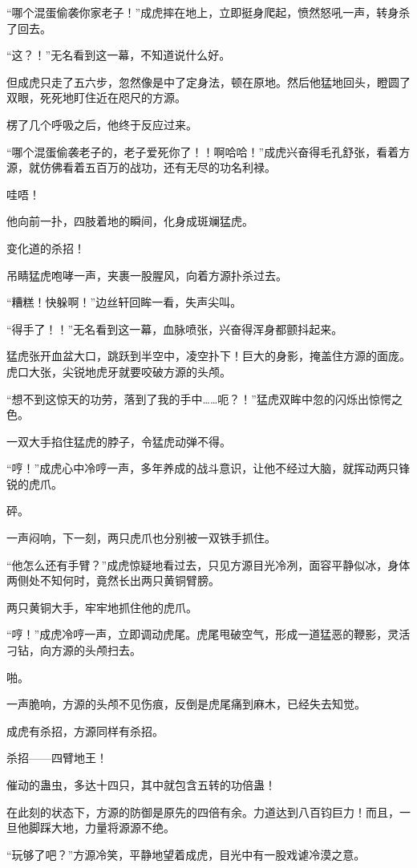 \begin{this_body}
“哪个混蛋偷袭你家老子！”成虎摔在地上，立即挺身爬起，愤然怒吼一声，转身杀了回去。

“这？！”无名看到这一幕，不知道说什么好。

但成虎只走了五六步，忽然像是中了定身法，顿在原地。然后他猛地回头，瞪圆了双眼，死死地盯住近在咫尺的方源。

楞了几个呼吸之后，他终于反应过来。

“哪个混蛋偷袭老子的，老子爱死你了！！啊哈哈！”成虎兴奋得毛孔舒张，看着方源，就仿佛看着五百万的战功，还有无尽的功名利禄。

哇唔！

他向前一扑，四肢着地的瞬间，化身成斑斓猛虎。

变化道的杀招！

吊睛猛虎咆哮一声，夹裹一股腥风，向着方源扑杀过去。

“糟糕！快躲啊！”边丝轩回眸一看，失声尖叫。

“得手了！！”无名看到这一幕，血脉喷张，兴奋得浑身都颤抖起来。

猛虎张开血盆大口，跳跃到半空中，凌空扑下！巨大的身影，掩盖住方源的面庞。虎口大张，尖锐地虎牙就要咬破方源的头颅。

“想不到这惊天的功劳，落到了我的手中……呃？！”猛虎双眸中忽的闪烁出惊愕之色。

一双大手掐住猛虎的脖子，令猛虎动弹不得。

“哼！”成虎心中冷哼一声，多年养成的战斗意识，让他不经过大脑，就挥动两只锋锐的虎爪。

砰。

一声闷响，下一刻，两只虎爪也分别被一双铁手抓住。

“他怎么还有手臂？”成虎惊疑地看过去，只见方源目光冷冽，面容平静似冰，身体两侧处不知何时，竟然长出两只黄铜臂膀。

两只黄铜大手，牢牢地抓住他的虎爪。

“哼！”成虎冷哼一声，立即调动虎尾。虎尾甩破空气，形成一道猛恶的鞭影，灵活刁钻，向方源的头颅扫去。

啪。

一声脆响，方源的头颅不见伤痕，反倒是虎尾痛到麻木，已经失去知觉。

成虎有杀招，方源同样有杀招。

杀招——四臂地王！

催动的蛊虫，多达十四只，其中就包含五转的功倍蛊！

在此刻的状态下，方源的防御是原先的四倍有余。力道达到八百钧巨力！而且，一旦他脚踩大地，力量将源源不绝。

“玩够了吧？”方源冷笑，平静地望着成虎，目光中有一股戏谑冷漠之意。


\end{this_body}
